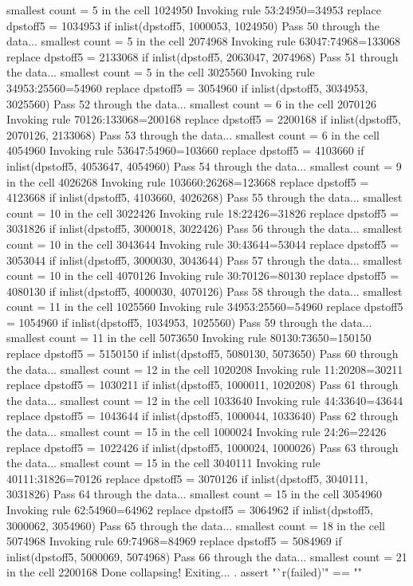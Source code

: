   smallest count = 5 in the cell      1024950
  Invoking rule 53:24950=34953
  replace dpstoff5 = 1034953 if inlist(dpstoff5, 1000053, 1024950)
Pass 50 through the data...
  smallest count = 5 in the cell      2074968
  Invoking rule 63047:74968=133068
  replace dpstoff5 = 2133068 if inlist(dpstoff5, 2063047, 2074968)
Pass 51 through the data...
  smallest count = 5 in the cell      3025560
  Invoking rule 34953:25560=54960
  replace dpstoff5 = 3054960 if inlist(dpstoff5, 3034953, 3025560)
Pass 52 through the data...
  smallest count = 6 in the cell      2070126
  Invoking rule 70126:133068=200168
  replace dpstoff5 = 2200168 if inlist(dpstoff5, 2070126, 2133068)
Pass 53 through the data...
  smallest count = 6 in the cell      4054960
  Invoking rule 53647:54960=103660
  replace dpstoff5 = 4103660 if inlist(dpstoff5, 4053647, 4054960)
Pass 54 through the data...
  smallest count = 9 in the cell      4026268
  Invoking rule 103660:26268=123668
  replace dpstoff5 = 4123668 if inlist(dpstoff5, 4103660, 4026268)
Pass 55 through the data...
  smallest count = 10 in the cell      3022426
  Invoking rule 18:22426=31826
  replace dpstoff5 = 3031826 if inlist(dpstoff5, 3000018, 3022426)
Pass 56 through the data...
  smallest count = 10 in the cell      3043644
  Invoking rule 30:43644=53044
  replace dpstoff5 = 3053044 if inlist(dpstoff5, 3000030, 3043644)
Pass 57 through the data...
  smallest count = 10 in the cell      4070126
  Invoking rule 30:70126=80130
  replace dpstoff5 = 4080130 if inlist(dpstoff5, 4000030, 4070126)
Pass 58 through the data...
  smallest count = 11 in the cell      1025560
  Invoking rule 34953:25560=54960
  replace dpstoff5 = 1054960 if inlist(dpstoff5, 1034953, 1025560)
Pass 59 through the data...
  smallest count = 11 in the cell      5073650
  Invoking rule 80130:73650=150150
  replace dpstoff5 = 5150150 if inlist(dpstoff5, 5080130, 5073650)
Pass 60 through the data...
  smallest count = 12 in the cell      1020208
  Invoking rule 11:20208=30211
  replace dpstoff5 = 1030211 if inlist(dpstoff5, 1000011, 1020208)
Pass 61 through the data...
  smallest count = 12 in the cell      1033640
  Invoking rule 44:33640=43644
  replace dpstoff5 = 1043644 if inlist(dpstoff5, 1000044, 1033640)
Pass 62 through the data...
  smallest count = 15 in the cell      1000024
  Invoking rule 24:26=22426
  replace dpstoff5 = 1022426 if inlist(dpstoff5, 1000024, 1000026)
Pass 63 through the data...
  smallest count = 15 in the cell      3040111
  Invoking rule 40111:31826=70126
  replace dpstoff5 = 3070126 if inlist(dpstoff5, 3040111, 3031826)
Pass 64 through the data...
  smallest count = 15 in the cell      3054960
  Invoking rule 62:54960=64962
  replace dpstoff5 = 3064962 if inlist(dpstoff5, 3000062, 3054960)
Pass 65 through the data...
  smallest count = 18 in the cell      5074968
  Invoking rule 69:74968=84969
  replace dpstoff5 = 5084969 if inlist(dpstoff5, 5000069, 5074968)
Pass 66 through the data...
  smallest count = 21 in the cell      2200168
  Done collapsing! Exiting...
{\smallskip}
. assert "`r(failed)'" == ""      
{\smallskip}
